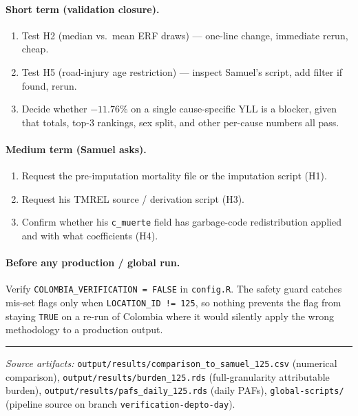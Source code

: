 \documentclass[11pt]{article}
\begin{document}
\paragraph{Short term (validation closure).}
\begin{enumerate}
  \item Test H2 (median vs.\ mean ERF draws) --- one-line change, immediate
    rerun, cheap.
  \item Test H5 (road-injury age restriction) --- inspect Samuel's script,
    add filter if found, rerun.
  \item Decide whether $-11.76\%$ on a single cause-specific YLL is a
    blocker, given that totals, top-3 rankings, sex split, and other
    per-cause numbers all pass.
\end{enumerate}

\paragraph{Medium term (Samuel asks).}
\begin{enumerate}
  \item Request the pre-imputation mortality file or the imputation
    script (H1).
  \item Request his TMREL source / derivation script (H3).
  \item Confirm whether his \texttt{c\_muerte} field has garbage-code
    redistribution applied and with what coefficients (H4).
\end{enumerate}

\paragraph{Before any production / global run.} Verify
\texttt{COLOMBIA\_VERIFICATION = FALSE} in \texttt{config.R}. The safety
guard catches mis-set flags only when \texttt{LOCATION\_ID != 125}, so
nothing prevents the flag from staying \texttt{TRUE} on a re-run of
Colombia where it would silently apply the wrong methodology to a
production output.

\bigskip
\hrule
\smallskip

\textit{Source artifacts:}
\texttt{output/results/comparison\_to\_samuel\_125.csv} (numerical
comparison),
\texttt{output/results/burden\_125.rds} (full-granularity attributable
burden),
\texttt{output/results/pafs\_daily\_125.rds} (daily PAFs),
\texttt{global-scripts/} (pipeline source on branch
\texttt{verification-depto-day}).
\end{document}
